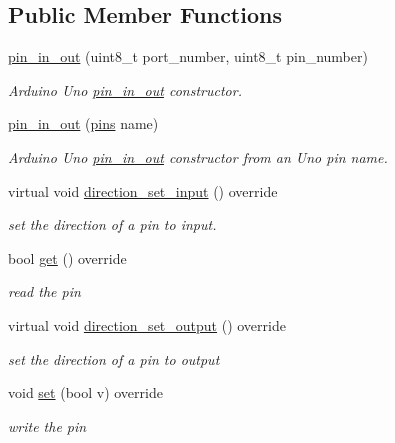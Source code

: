 \subsection*{Public Member Functions}
\begin{DoxyCompactItemize}
\item 
\hyperlink{classuno_1_1pin__in__out_a91b2aafcc54ded374b14f7a12b18f0f6}{pin\+\_\+in\+\_\+out} (uint8\+\_\+t port\+\_\+number, uint8\+\_\+t pin\+\_\+number)
\begin{DoxyCompactList}\small\item\em Arduino Uno \hyperlink{classuno_1_1pin__in__out}{pin\+\_\+in\+\_\+out} constructor. \end{DoxyCompactList}\item 
\hyperlink{classuno_1_1pin__in__out_adeaea8daf6c3a38eb626ef2cac83a696}{pin\+\_\+in\+\_\+out} (\hyperlink{namespaceuno_a0a859f3512bcc3027a090ae07befd5b2}{pins} name)
\begin{DoxyCompactList}\small\item\em Arduino Uno \hyperlink{classuno_1_1pin__in__out}{pin\+\_\+in\+\_\+out} constructor from an Uno pin name. \end{DoxyCompactList}\item 
virtual void \hyperlink{classuno_1_1pin__in__out_a3266305bdd8da6ac1cfc5800888b991f}{direction\+\_\+set\+\_\+input} () override
\begin{DoxyCompactList}\small\item\em set the direction of a pin to input. \end{DoxyCompactList}\item 
bool \hyperlink{classuno_1_1pin__in__out_a33af53c3055024ab73b1092586dabe60}{get} () override
\begin{DoxyCompactList}\small\item\em read the pin \end{DoxyCompactList}\item 
virtual void \hyperlink{classuno_1_1pin__in__out_aaa337ac985b7181a8012a37bad7d4c60}{direction\+\_\+set\+\_\+output} () override
\begin{DoxyCompactList}\small\item\em set the direction of a pin to output \end{DoxyCompactList}\item 
void \hyperlink{classuno_1_1pin__in__out_a54cb255e06318c8fef9f7595c50e3588}{set} (bool v) override
\begin{DoxyCompactList}\small\item\em write the pin \end{DoxyCompactList}\end{DoxyCompactItemize}


